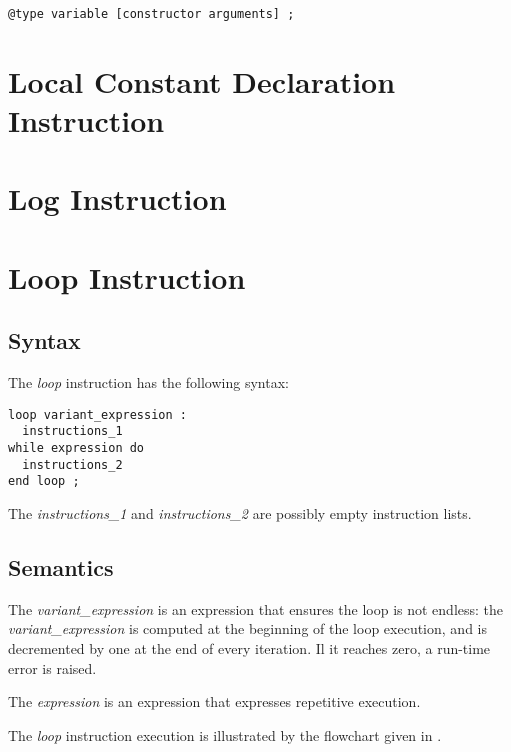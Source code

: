 {
\begin{lstlisting}[language=galgas]
@type variable [constructor arguments] ;
\end{lstlisting}
}


\section{Local Constant Declaration Instruction}




\section{Log Instruction}




\section{Loop Instruction}


\subsection{Syntax}

The \emph{loop} instruction has the following syntax:
{
\begin{lstlisting}[language=galgas]
loop variant_expression :
  instructions_1
while expression do
  instructions_2
end loop ;  
\end{lstlisting}
}

The \emph{instructions\_1} and \emph{instructions\_2} are possibly empty instruction lists.

\subsection{Semantics}

The \emph{variant\_expression} is an  expression that ensures the loop is not endless: the \emph{variant\_expression} is computed at the beginning of the loop execution, and is decremented by one at the end of every iteration. Il it reaches zero, a run-time error is raised.

The \emph{expression} is an  expression that expresses repetitive execution.

The \emph{loop} instruction execution is illustrated by the flowchart given in .

